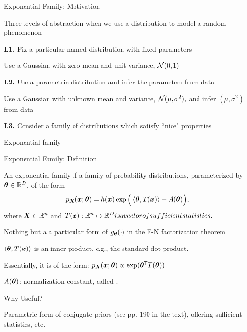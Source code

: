 \documentclass[handout,fleqn,aspectratio=169]{beamer}
\begin{document}
\begin{frame}{Exponential Family: Motivation} 

\plitemsep 0.15in
\bci 
\item Three levels of abstraction when we use a distribution to model a random phenomenon

\item[\bf L1.] Fix a particular named distribution with fixed parameters
\bci
\item \exam Use a Gaussian with zero mean and unit variance, $\mathcal N(0,1)$
\eci
\item[\bf L2.] Use a parametric distribution and infer the parameters from data
\bci
\item \exam Use a Gaussian with unknown mean and variance, $\mathcal N(\mu,\sigma^2),$ and infer $(\mu,\sigma^2)$ from data
\eci

\item[\bf L3.] Consider a family of distributions which satisfy ``nice" properties  

\bci
\item \exam Exponential family
\eci

\eci

\end{frame}

\begin{frame}{Exponential Family: Definition} 

{
An exponential family if a family of probability distributions, parameterized by $\bm{\theta} \in {\mathbb R}^D$, of the form
$$
p_{\bm{X}} (\bm{x};\bm{\theta}) = h(\bm{x}) \exp\Big(\left\langle \bm{\theta}, T(\bm{x}) \right\rangle - A(\bm{\theta})\Big),
$$
where $\bm{X} \in {\mathbb R}^{n}$ and $T(\bm{x}): {\mathbb R}^{n} \mapsto {\mathbb R}^{D} is a vector of sufficient statistics.$
}

\vspace{-0.4cm}
\plitemsep 0.03in
\bci 

\item Nothing but a a particular form of $g_{\bm{\theta}}(\cdot)$ in the F-N factorization theorem
\item $\left\langle \bm{\theta}, T(\bm{x}) \right\rangle$ is an inner product, e.g., the standard dot product. 
\item Essentially, it is of the form: $p_{\bm{X}}(\bm{x};\bm{\theta}) \propto \exp({\bm{\theta}}^{\mathsf{T}}T(\bm{\theta}))$
\item $A(\bm{\theta})$: normalization constant, called .


\item Why Useful?
\bci
\item Parametric form of conjugate priors (see pp. 190 in the text), offering sufficient statistics, etc.
\eci
\eci

\end{frame}
\end{document}
